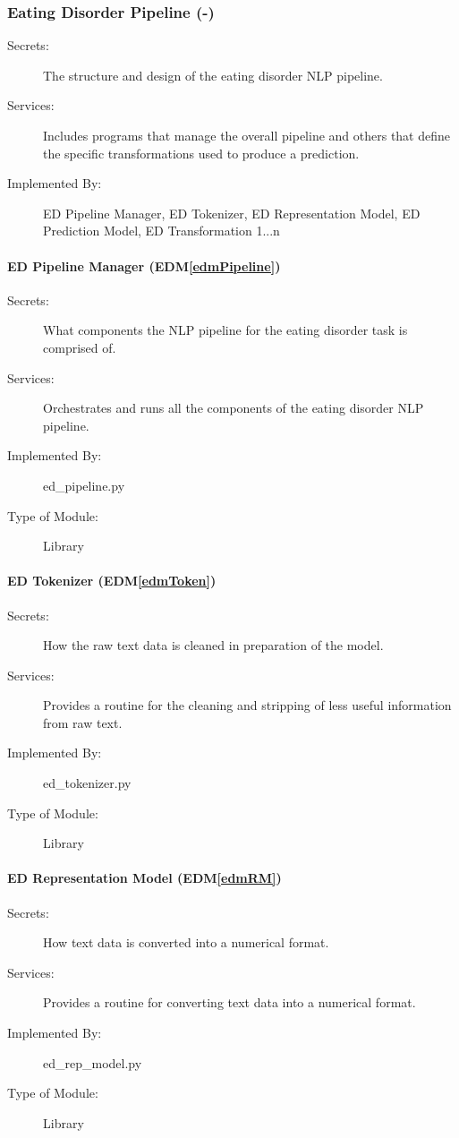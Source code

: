\documentclass[12pt, titlepage]{article}
\newcommand{\edmref}[1]{EDM\ref{#1}}
\begin{document}
\subsubsection{Eating Disorder Pipeline (-)}
\begin{description}
\item[Secrets:] The structure and design of the eating disorder NLP pipeline.
\item[Services:] Includes programs that manage the overall pipeline and others that define the specific transformations used to produce a prediction.
\item[Implemented By:] ED Pipeline Manager, ED Tokenizer, ED Representation Model, ED Prediction Model, ED Transformation 1...n
\end{description}

\paragraph{ED Pipeline Manager (\edmref{edmPipeline})}
\begin{description}
\item[Secrets:] What components the NLP pipeline for the eating disorder task is comprised of.
\item[Services:] Orchestrates and runs all the components of the eating disorder NLP pipeline.
\item[Implemented By:] ed\_pipeline.py
\item[Type of Module:] Library
\end{description}

\paragraph{ED Tokenizer (\edmref{edmToken})}
\begin{description}
\item[Secrets:] How the raw text data is cleaned in preparation of the model.
\item[Services:] Provides a routine for the cleaning and stripping of less useful information from raw text.
\item[Implemented By:] ed\_tokenizer.py
\item[Type of Module:] Library
\end{description}

\paragraph{ED Representation Model (\edmref{edmRM})}
\begin{description}
\item[Secrets:] How text data is converted into a numerical format.
\item[Services:] Provides a routine for converting text data into a numerical format.
\item[Implemented By:] ed\_rep\_model.py
\item[Type of Module:] Library
\end{description}
\end{document}

